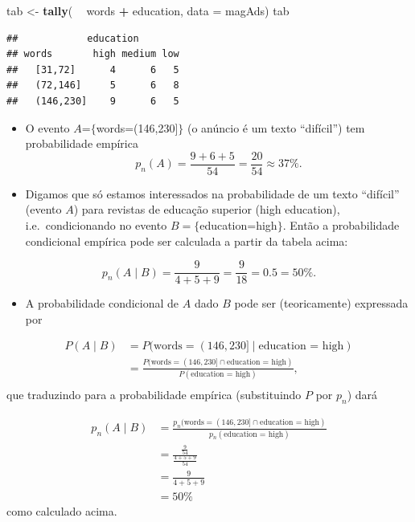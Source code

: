 \documentclass[]{article}
\newenvironment{Shaded}{\begin{snugshade}}{\end{snugshade}}
\newcommand{\KeywordTok}[1]{\textcolor[rgb]{0.13,0.29,0.53}{\textbf{#1}}}
\newcommand{\DataTypeTok}[1]{\textcolor[rgb]{0.13,0.29,0.53}{#1}}
\newcommand{\StringTok}[1]{\textcolor[rgb]{0.31,0.60,0.02}{#1}}
\newcommand{\OperatorTok}[1]{\textcolor[rgb]{0.81,0.36,0.00}{\textbf{#1}}}
\newcommand{\NormalTok}[1]{#1}
\providecommand{\tightlist}{%
  \setlength{\itemsep}{0pt}\setlength{\parskip}{0pt}}
\begin{document}
\begin{Shaded}
\begin{Highlighting}[]
\NormalTok{tab <-}\StringTok{ }\KeywordTok{tally}\NormalTok{( }\OperatorTok{~}\StringTok{ }\NormalTok{words }\OperatorTok{+}\StringTok{ }\NormalTok{education, }\DataTypeTok{data =}\NormalTok{ magAds)}
\NormalTok{tab}
\end{Highlighting}
\end{Shaded}

\begin{verbatim}
##            education
## words       high medium low
##   [31,72]      4      6   5
##   (72,146]     5      6   8
##   (146,230]    9      6   5
\end{verbatim}

\begin{itemize}
\tightlist
\item
  O evento \(A\)=\(\{\)words=(146,230{]}\(\}\) (o anúncio é um texto
  ``difícil'') tem probabilidade empírica
  \[ p_n(A) = \frac{9 + 6 + 5}{54} = \frac{20}{54} \approx 37 \%.\]
\item
  Digamos que só estamos interessados na probabilidade de um texto
  ``difícil'' (evento \(A\)) para revistas de educação superior (high
  education), i.e.~condicionando no evento \(B=\{\)education=high\(\}\).
  Então a probabilidade condicional empírica pode ser calculada a partir
  da tabela acima:
\end{itemize}

\[
  p_n(A \mid B) = \frac{9}{4+5+9} = \frac{9}{18} = 0.5 = 50\%.
  \]

\begin{itemize}
\tightlist
\item
  A probabilidade condicional de \(A\) dado \(B\) pode ser
  (teoricamente) expressada por
\end{itemize}

\[
  \begin{aligned}
  P(A \mid B) 
  &= P(\text{words} =(146,230] \mid \text{education = high})  \\[0.5em]
  &= \frac{P(\text{words} =(146,230] \cap \text{education = high})}{P(\text{education = high})},  \\
  \end{aligned}
  \] que traduzindo para a probabilidade empírica (substituindo \(P\)
por \(p_n\)) dará

\[
  \begin{aligned}
  p_n(A \mid B) 
  &= \frac{p_n(\text{words} =(146,230] \cap \text{education = high})}{p_n(\text{education = high})}  \\
  &= \frac{\frac{9}{54}}{\frac{4+5+9}{54}} \\
  &= \frac{9}{4+5+9} \\[0.5em]
  &= 50\%
  \end{aligned}
  \] como calculado acima.
\end{document}
